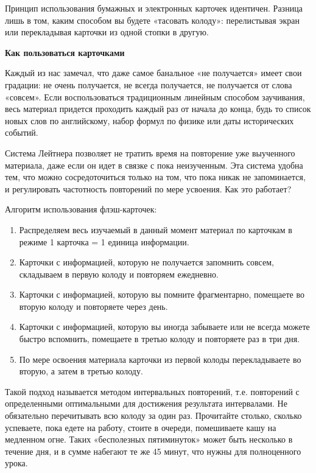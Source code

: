 Принцип использования бумажных и электронных карточек идентичен. Разница лишь в том, каким способом вы будете «тасовать колоду»: перелистывая экран или перекладывая карточки из одной стопки в другую.

\textbf{Как пользоваться карточками}

Каждый из нас замечал, что даже самое банальное «не получается» имеет свои градации: не очень получается, не всегда получается, не получается от слова «совсем». Если воспользоваться традиционным линейным способом заучивания, весь материал придется проходить каждый раз от начала до конца, будь то список новых слов по английскому, набор формул по физике или даты исторических событий.

Система Лейтнера позволяет не тратить время на повторение уже выученного материала, даже если он идет в связке с пока неизученным. Эта система удобна тем, что можно сосредоточиться только на том, что пока никак не запоминается, и регулировать частотность повторений по мере усвоения. Как это работает?



Алгоритм использования флэш-карточек:
\begin{enumerate}
    \item Распределяем весь изучаемый в данный момент материал по карточкам в режиме 1 карточка = 1 единица информации.
    \item Карточки с информацией, которую не получается запомнить совсем, складываем в первую колоду и повторяем ежедневно.
    \item Карточки с информацией, которую вы помните фрагментарно, помещаете во вторую колоду и повторяете через день.
    \item Карточки с информацией, которую вы иногда забываете или не всегда можете быстро вспомнить, помещаете в третью колоду и повторяете раз в три дня.
    \item По мере освоения материала карточки из первой колоды перекладываете во вторую, а затем в третью колоду.
\end{enumerate}

Такой подход называется методом интервальных повторений, т.е. повторений с определенными оптимальными для достижения результата интервалами. Не обязательно перечитывать всю колоду за один раз. Прочитайте столько, сколько успеваете, пока едете на работу, стоите в очереди, помешиваете кашу на медленном огне. Таких «бесполезных пятиминуток» может быть несколько в течение дня, и в сумме набегают те же 45 минут, что нужны для полноценного урока.

